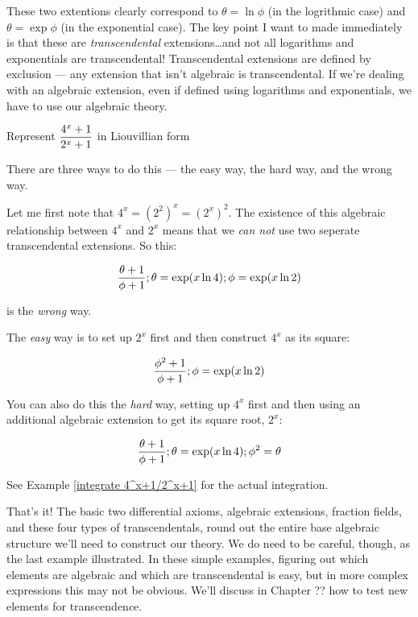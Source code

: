 These two extentions clearly correspond to $\theta = \ln\phi$ (in the
logrithmic case) and $\theta = \exp\phi$ (in the exponential case).
The key point I want to made immediately is that these are {\it
transcendental} extensions\ldots and not all logarithms and
exponentials are transcendental!  Transcendental extensions are
defined by exclusion --- any extension that isn't algebraic is
transcendental.  If we're dealing with an algebraic extension, even if
defined using logarithms and exponentials, we have to use our
algebraic theory.

\example Represent $\displaystyle {{4^x+1}\over{2^x+1}}$ in Liouvillian form\label{represent 4^x+1/2^x+1}

There are three ways to do this --- the easy way, the hard way, and
the wrong way.

Let me first note that $4^x = (2^2)^x = (2^x)^2$.  The existence of
this algebraic relationship between $4^x$ and $2^x$ means that we {\it
can not} use two seperate transcendental extensions.  So this:

$${{\theta+1}\over{\phi+1}}; \theta = \exp(x \ln 4); \phi = \exp(x \ln 2)$$

is the {\it wrong} way.

The {\it easy} way is to set up $2^x$ first and then construct $4^x$
as its square:

$${{\phi^2+1}\over{\phi+1}}; \phi = \exp(x \ln 2)$$

You can also do this the {\it hard} way, setting up $4^x$ first and
then using an additional algebraic extension to get its square root,
$2^x$:

$${{\theta+1}\over{\phi+1}}; \theta = \exp(x \ln 4); \phi^2 = \theta$$

See Example \ref{integrate 4^x+1/2^x+1} for the actual integration.

\endexample

That's it!  The basic two differential axioms, algebraic extensions,
fraction fields, and these four types of transcendentals, round out
the entire base algebraic structure we'll need to construct our
theory.  We do need to be careful, though, as the last example
illustrated.  In these simple examples, figuring out which elements
are algebraic and which are transcendental is easy, but in more
complex expressions this may not be obvious.  We'll discuss in Chapter
?? how to test new elements for transcendence.

